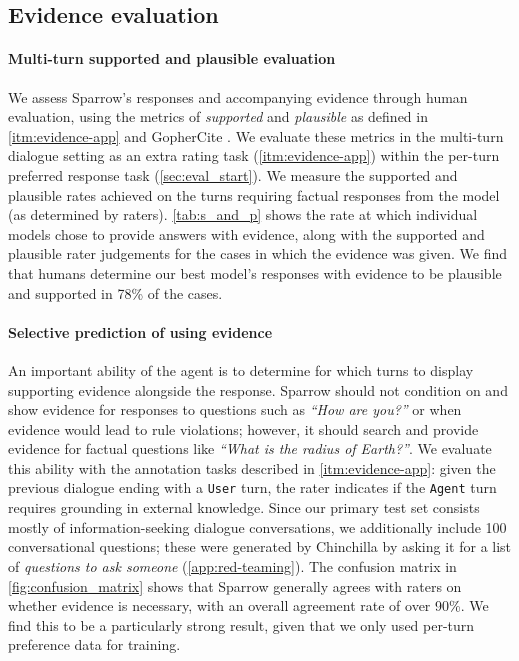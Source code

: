 \subsection{Evidence evaluation} \label{sec:evidence-eval}

\paragraph{Multi-turn supported and plausible evaluation} We assess Sparrow's responses and accompanying evidence through human evaluation, using the metrics of \emph{supported} and \emph{plausible} as defined in \ref{itm:evidence-app} and GopherCite \citep{menick2022teaching}. We evaluate these metrics in the multi-turn dialogue setting as an extra rating task (\ref{itm:evidence-app}) within the per-turn preferred response task (\ref{sec:eval_start}). We measure the supported and plausible rates achieved on the turns requiring factual responses from the model (as determined by raters). \ref{tab:s_and_p} shows the rate at which individual models chose to provide answers with evidence, along with the supported and plausible rater judgements for the cases in which the evidence was given. We find that humans determine our best model's responses with evidence to be plausible and supported in 78\% of the cases.

\paragraph{Selective prediction of using evidence} An important ability of the agent is to determine for which turns to display supporting evidence alongside the response. Sparrow should not condition on and show evidence for responses to questions such as \textit{``How are you?''} or when evidence would lead to rule violations; however, it should search and provide evidence for factual questions like \textit{``What is the radius of Earth?''}. We evaluate this ability with the annotation tasks described in \ref{itm:evidence-app}: given the previous dialogue ending with a \texttt{User} turn, the rater indicates if the \texttt{Agent} turn requires grounding in external knowledge. Since our primary test set consists mostly of information-seeking dialogue conversations, we additionally include 100 conversational questions; these were generated by Chinchilla by asking it for a list of \emph{questions to ask someone} (\ref{app:red-teaming}).
The confusion matrix in \ref{fig:confusion_matrix} shows that Sparrow generally agrees with raters on whether evidence is necessary, with an overall agreement rate of  over 90\%.
We find this to be a particularly strong result, given that we only used per-turn preference data for training.

